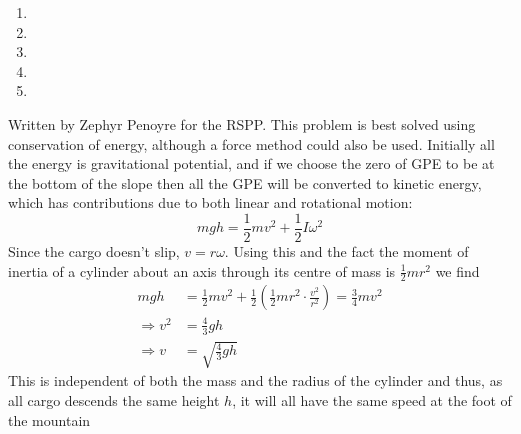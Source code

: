 
\begin{hint}
{
\begin{enumerate}
	\item {}
	\item {}
	\item {}
	\item {}
	\item {}
\end{enumerate}
  }
{}
{Written by Zephyr Penoyre for the RSPP.}
{
This problem is best solved using conservation of energy, although a force method could also be used. Initially all the energy is gravitational potential, and if we choose the zero of GPE to be at the bottom of the slope then all the GPE will be converted to kinetic energy, which has contributions due to both linear and rotational motion:
\begin{equation*}
mgh=\frac{1}{2}mv^2+\frac{1}{2}I\omega^2
\end{equation*}
Since the cargo doesn't slip, $v=r\omega$. Using this and the fact the moment of inertia of a cylinder about an axis through its centre of mass is $\frac{1}{2}mr^2$ we find
\begin{align*}
mgh&=\frac{1}{2}mv^2+\frac{1}{2}\left(\frac{1}{2}mr^2\cdot \frac{v^2}{r^2}\right)=\frac{3}{4}mv^2 \\
\Rightarrow v^2&=\frac{4}{3}gh \\
\Rightarrow v&=\sqrt{\frac{4}{3}gh}
\end{align*}
This is independent of both the mass and the radius of the cylinder and thus, as all cargo descends the same height $h$, it will all have the same speed at the foot of the mountain
}
\end{hint}